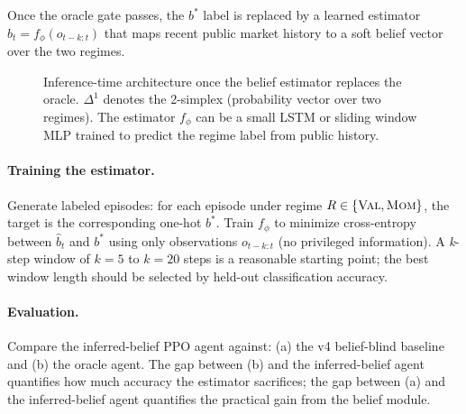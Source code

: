 \documentclass[11pt]{article}
\begin{document}
Once the oracle gate passes, the $b^*$ label is replaced by a learned
estimator $\hat{b}_t = f_\phi(o_{t-k:t})$ that maps recent public market
history to a soft belief vector over the two regimes.

\begin{figure}[H]
\centering
{}
\caption{Inference-time architecture once the belief estimator replaces the
         oracle.  $\Delta^1$ denotes the 2-simplex (probability vector over
         two regimes). The estimator $f_\phi$ can be a small LSTM or sliding
         window MLP trained to predict the regime label from public history.}
\label{fig:inferred}
\end{figure}

\paragraph{Training the estimator.}
Generate labeled episodes: for each episode under regime $R \in
\{\textsc{Val}, \textsc{Mom}\}$, the target is the corresponding
one-hot $b^*$.
Train $f_\phi$ to minimize cross-entropy between $\hat{b}_t$ and $b^*$
using only observations $o_{t-k:t}$ (no privileged information).
A \textit{k}-step window of $k=5$ to $k=20$ steps is a reasonable starting
point; the best window length should be selected by held-out classification
accuracy.

\paragraph{Evaluation.}
Compare the inferred-belief PPO agent against:
(a) the v4 belief-blind baseline and
(b) the oracle agent.
The gap between (b) and the inferred-belief agent quantifies how much
accuracy the estimator sacrifices; the gap between (a) and the
inferred-belief agent quantifies the practical gain from the belief module.
\end{document}
